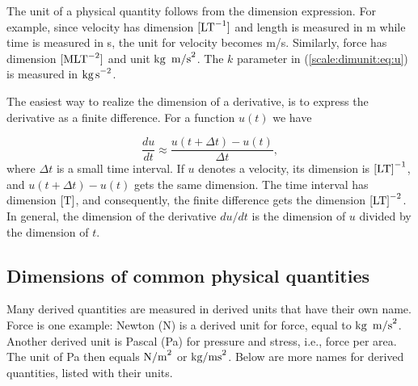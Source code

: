 \documentclass[graybox,envcountchap,sectrefs,final]{svmonodo}
\newenvironment{notice_mdfboxadmon}[1][]{
\begin{notice_mdfboxmdframed}[frametitle=#1]
}
{
\end{notice_mdfboxmdframed}
}
\begin{document}
The unit of a physical quantity follows from the dimension expression.
For example, since velocity has dimension $[\hbox{LT}^{-1}]$ and length
is measured in m while time is measured in s, the unit for velocity
becomes m/s. Similarly, force has dimension $[\hbox{MLT}^{-2}]$ and
unit $\hbox{kg\, m/s}^2$. The $k$ parameter in
(\ref{scale:dimunit:eq:u}) is measured in $\hbox{kg\,s}^{-2}$.


\begin{notice_mdfboxadmon}
The easiest way to realize the dimension of a derivative, is to express
the derivative as a finite difference. For a function $u(t)$ we have

\[ \frac{du}{dt} \approx \frac{u(t+\Delta t)- u(t)}{\Delta t},\]
where $\Delta t$ is a small time interval.
If $u$ denotes a velocity, its dimension is $\hbox{[LT]}^{-1}$,
and $u(t+\Delta t) - u(t)$ gets the same dimension. The time
interval has dimension $\hbox{[T]}$, and consequently, the
finite difference gets the dimension $\hbox{[LT]}^{-2}$.
In general, the dimension of the derivative $du/dt$ is the dimension
of $u$ divided by the dimension of $t$.
\end{notice_mdfboxadmon}




\subsection{Dimensions of common physical quantities}
\label{scale:dimunit:tables}


Many derived quantities are measured in derived units that have their
own name. Force is one example: Newton (N) is a derived unit for
force, equal to $\hbox{kg\, m/s}^2$. Another derived unit is Pascal
(Pa) for pressure and stress, i.e., force per area. The unit of Pa
then equals $\hbox{N/m}^2$ or $\hbox{kg/ms}^2$. Below are more names
for derived
quantities, listed with their units.
\end{document}
